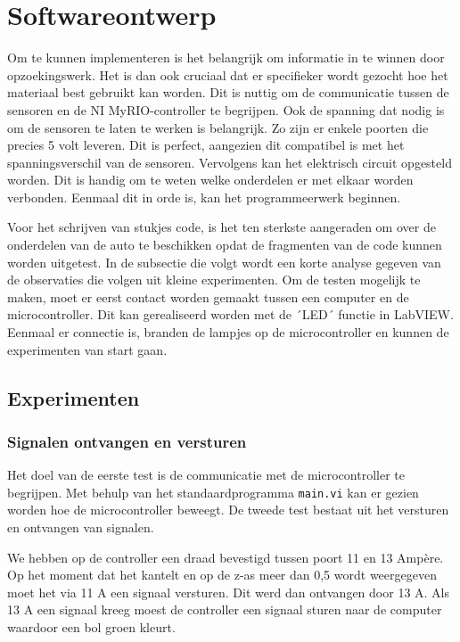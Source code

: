\documentclass[a4paper,twoside,kulak]{kulakreport} %
\begin{document}
\section{Softwareontwerp}\label{Softwareontwerp}
Om te kunnen implementeren is het belangrijk om informatie in te winnen door opzoekingswerk. Het is dan ook cruciaal dat er specifieker wordt gezocht hoe het materiaal best gebruikt kan worden.
Dit is nuttig om de communicatie tussen de sensoren en de NI MyRIO-controller te begrijpen. Ook de spanning dat nodig is om de sensoren te laten te werken is belangrijk. Zo zijn er enkele poorten die precies 5 volt leveren. Dit is perfect, aangezien dit compatibel is met het spanningsverschil van de sensoren. Vervolgens kan het elektrisch circuit opgesteld worden. Dit is handig om te weten welke onderdelen er met elkaar worden verbonden. Eenmaal dit in orde is, kan het programmeerwerk beginnen.

Voor het schrijven van stukjes code, is het ten sterkste aangeraden om over de onderdelen van de auto te beschikken opdat de fragmenten van de code kunnen worden uitgetest. In de subsectie die volgt wordt een korte analyse gegeven van de observaties die volgen uit kleine experimenten. Om de testen mogelijk te maken, moet er eerst contact worden gemaakt tussen een computer en de microcontroller. Dit kan gerealiseerd worden met de ´LED´ functie in LabVIEW. Eenmaal er connectie is, branden de lampjes op de microcontroller en kunnen de experimenten van start gaan.


\subsection{Experimenten}
\subsubsection{Signalen ontvangen en versturen}
Het doel van de eerste test is de communicatie met de microcontroller te begrijpen. Met behulp van het standaardprogramma \texttt{main.vi} kan er gezien worden hoe de microcontroller beweegt. 
De tweede test bestaat uit het versturen en ontvangen van signalen. 

We hebben op de controller een draad bevestigd tussen poort 11 en 13 Ampère. Op het moment dat het kantelt en op de z-as meer dan 0,5 wordt weergegeven moet het via 11 A een signaal versturen. Dit werd dan ontvangen door 13 A. Als 13 A een signaal kreeg moest de controller een signaal sturen naar de computer waardoor een bol groen kleurt. 
\end{document}
